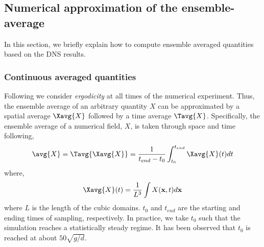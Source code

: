\subsection{Numerical approximation of the ensemble-average}

In this section, we briefly explain how to compute ensemble averaged quantities based on the DNS results. 

\subsubsection{Continuous averaged quantities}

Following \citet{du2022analysis} we consider \textit{ergodicity} at all times of the numerical experiment.
Thus, the ensemble average of an arbitrary quantity $X$ can be approximated by a spatial average $\Xavg{X}$ followed by a time average $\Tavg{X}$. 
Specifically, the ensemble average of a numerical field, $X$, is taken through space and time following,
\begin{equation}
    \avg{X}
    = \Tavg{\Xavg{X}}
    = \frac{1}{ t_{end} - t_0}\int_{t_0}^{t_{end}} 
    \Xavg{X}(t) dt
\end{equation}
where, 
\begin{equation}
    \Xavg{X}(t)
    = \frac{1}{L^3}\int 
    X(\textbf{x},t) d\textbf{x}
\end{equation}
where $L$ is the length of the cubic domains.
$t_0$ and $t_{end}$ are the starting and ending times of sampling, respectively.
In practice, we take $t_0$ such that the simulation reaches a statistically steady regime.  
It has been observed that $t_0$ is reached at about $50 \sqrt{g/d}$. 


